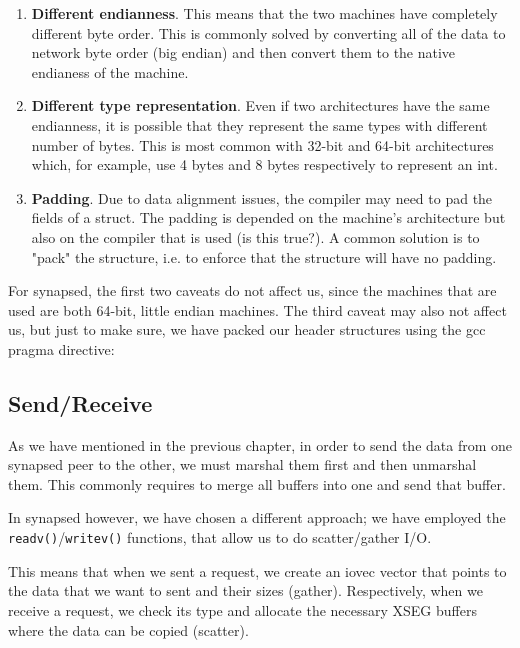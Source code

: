 \begin{enumerate}
	\item \textbf{Different endianness}. This means that the two machines have 
		completely different byte order. This is commonly solved by converting 
		all of the data to network byte order (big endian) and then convert 
		them to the native endianess of the machine.
	\item \textbf{Different type representation}. Even if two architectures 
		have the same endianness, it is possible that they represent the same 
		types with different number of bytes. This is most common with 32-bit 
		and 64-bit architectures which, for example, use 4 bytes and 8 bytes 
		respectively to represent an int.
	\item \textbf{Padding}. Due to data alignment issues, the compiler may need 
		to pad the fields of a struct. The padding is depended on the machine's 
		architecture but also on the compiler that is used (\fixme is this 
		true?).  A common solution is to "pack" the structure, i.e. to enforce 
		that the structure will have no padding.
\end{enumerate}

For synapsed, the first two caveats do not affect us, since the machines that 
are used are both 64-bit, little endian machines. The third caveat may also not 
affect us, but just to make sure, we have packed our header structures using 
the gcc pragma directive:


\subsection{Send/Receive}

As we have mentioned in the previous chapter, in order to send the data from 
one synapsed peer to the other, we must marshal them first and then unmarshal 
them. This commonly requires to merge all buffers into one and send that 
buffer.  

In synapsed however, we have chosen a different approach; we have employed the 
\texttt{readv()}/\texttt{writev()} functions, that allow us to do 
scatter/gather I/O.

This means that when we sent a request, we create an iovec vector that points 
to the data that we want to sent and their sizes (gather). Respectively, when 
we receive a request, we check its type and allocate the necessary XSEG buffers 
where the data can be copied (scatter).

